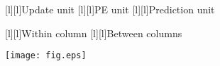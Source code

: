 \documentclass[12pt]{standalone}
\begin{document}
\Large

[l][l]{\textsf{Update unit}}
[l][l]{\textsf{PE unit}}
[l][l]{\textsf{Prediction unit}}

[l][l]{\textsf{Within column}}
[l][l]{\textsf{Between columns}}

\texttt{[image: fig.eps]}
\end{document}
